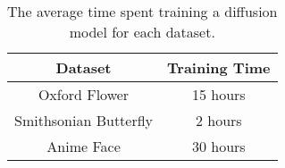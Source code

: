 \begin{table}
    \centering
    \begin{tabular}{ | c | c | }
      \hline
      Dataset & Training Time \\ 
      \hline
Oxford Flower & 15 hours \\
\hline
Smithsonian Butterfly & 2 hours \\
\hline
Anime Face & 30 hours \\
\hline
    \end{tabular}
    \caption{The average time spent training a diffusion model for each dataset.}
    \label{table:training_time}
  \end{table}